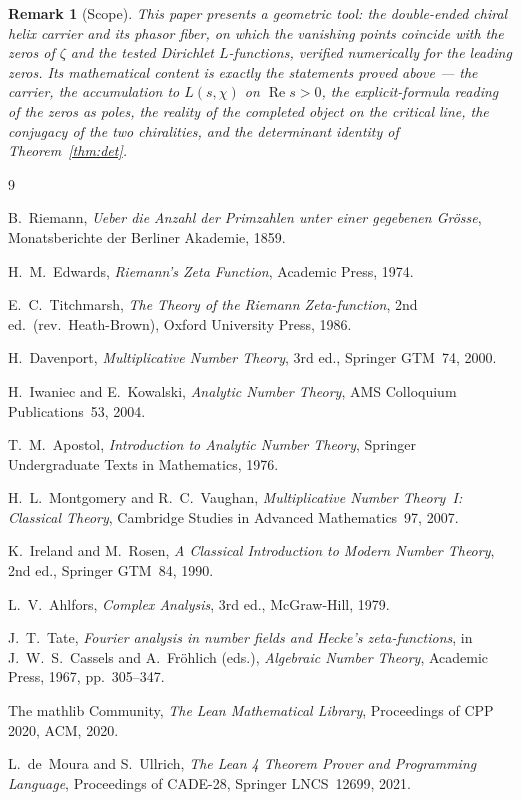 \documentclass[11pt]{article}
\newtheorem{remark}[definition]{Remark}
\DeclareMathOperator{\Ree}{Re}
\begin{document}
\begin{remark}[Scope]\label{rem:scope}
This paper presents a geometric tool: the double-ended chiral helix carrier and its phasor fiber, on
which the vanishing points coincide with the zeros of $\zeta$ and the tested Dirichlet
$L$-functions, verified numerically for the leading zeros. Its mathematical content is exactly the
statements proved above --- the carrier, the accumulation to $L(s,\chi)$ on $\Ree s>0$, the
explicit-formula reading of the zeros as poles, the reality of the completed object on the critical
line, the conjugacy of the two chiralities, and the determinant identity of Theorem~\ref{thm:det}.
\end{remark}

\begin{thebibliography}{9}

 B.~Riemann,
\emph{Ueber die Anzahl der Primzahlen unter einer gegebenen Gr\"osse},
Monatsberichte der Berliner Akademie, 1859.

 H.~M.~Edwards,
\emph{Riemann's Zeta Function}, Academic Press, 1974.

 E.~C.~Titchmarsh,
\emph{The Theory of the Riemann Zeta-function}, 2nd ed.\ (rev.\ Heath-Brown),
Oxford University Press, 1986.

 H.~Davenport,
\emph{Multiplicative Number Theory}, 3rd ed., Springer GTM~74, 2000.

 H.~Iwaniec and E.~Kowalski,
\emph{Analytic Number Theory}, AMS Colloquium Publications~53, 2004.

 T.~M.~Apostol,
\emph{Introduction to Analytic Number Theory}, Springer Undergraduate Texts in Mathematics, 1976.

 H.~L.~Montgomery and R.~C.~Vaughan,
\emph{Multiplicative Number Theory~I: Classical Theory},
Cambridge Studies in Advanced Mathematics~97, 2007.

 K.~Ireland and M.~Rosen,
\emph{A Classical Introduction to Modern Number Theory}, 2nd ed., Springer GTM~84, 1990.

 L.~V.~Ahlfors,
\emph{Complex Analysis}, 3rd ed., McGraw-Hill, 1979.

 J.~T.~Tate,
\emph{Fourier analysis in number fields and Hecke's zeta-functions}, in
J.~W.~S.~Cassels and A.~Fr\"ohlich (eds.), \emph{Algebraic Number Theory},
Academic Press, 1967, pp.~305--347.

 The mathlib Community,
\emph{The Lean Mathematical Library},
Proceedings of CPP 2020, ACM, 2020.

 L.~de~Moura and S.~Ullrich,
\emph{The Lean 4 Theorem Prover and Programming Language},
Proceedings of CADE-28, Springer LNCS~12699, 2021.

\end{thebibliography}
\end{document}
